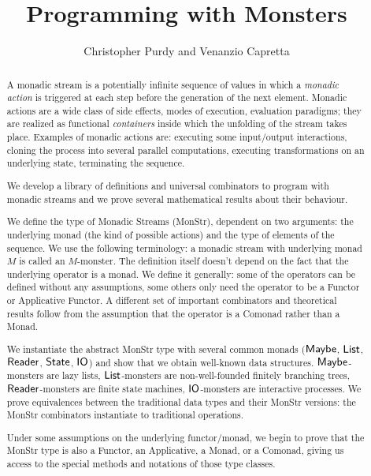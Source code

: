 \documentclass{article}
\title{Programming with Monsters}
\author{Christopher Purdy and Venanzio Capretta}
\begin{document}


\maketitle

\begin{abstract}
A monadic stream is a potentially infinite sequence of values in which a {\em monadic action} is triggered at each step before the generation of the next element.
Monadic actions are a wide class of side effects, modes of execution, evaluation paradigms; they are realized as functional {\em containers} inside which the unfolding of the stream takes place.
Examples of monadic actions are: executing some input/output interactions, cloning the process into several parallel computations, executing transformations on an underlying state, terminating the sequence.

We develop a library of definitions and universal combinators to program with monadic streams and we prove several mathematical results about their behaviour.

We define the type of Monadic Streams (MonStr), dependent on two arguments: the underlying monad (the kind of possible actions) and the type of elements of the sequence.
We use the following terminology: a monadic stream with underlying monad $M$ is called an $M$-monster.
The definition itself doesn't depend on the fact that the underlying operator is a monad.
We define it generally: some of the operators can be defined without any assumptions, some others only need the operator to be a Functor or Applicative Functor.
A different set of important combinators and theoretical results follow from the assumption that the operator is a Comonad rather than a Monad.

We instantiate the abstract MonStr type with several common monads ($\mathsf{Maybe}$, $\mathsf{List}$, $\mathsf{Reader}$, $\mathsf{State}$, $\mathsf{IO}$) and show that we obtain well-known data structures.
$\mathsf{Maybe}$-monsters are lazy lists, $\mathsf{List}$-monsters are non-well-founded finitely branching trees, $\mathsf{Reader}$-monsters are finite state machines, $\mathsf{IO}$-monsters are interactive processes.
We prove equivalences between the traditional data types and their MonStr versions: the MonStr combinators instantiate to traditional operations.

Under some assumptions on the underlying functor/monad, we begin to prove that the MonStr type is also a Functor, an Applicative, a Monad, or a Comonad, giving us access to the special methods and notations of those type classes.
\end{abstract}


















\end{document}

